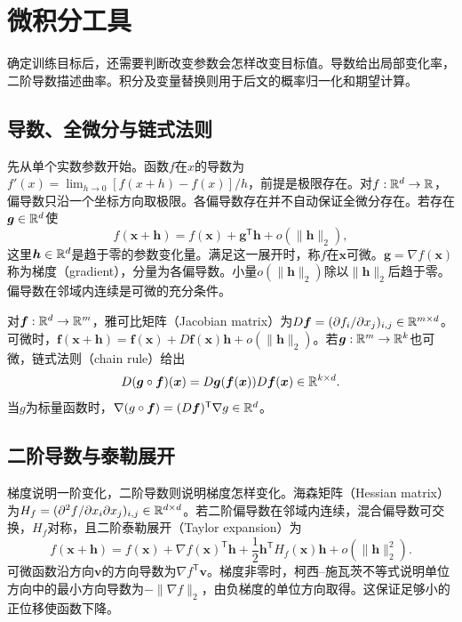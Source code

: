 \section{微积分工具}
确定训练目标后，还需要判断改变参数会怎样改变目标值。导数给出局部变化率，二阶导数描述曲率。积分及变量替换则用于后文的概率归一化和期望计算。
\subsection{导数、全微分与链式法则}
先从单个实数参数开始。函数$f$在$x$的导数为$f'(x)=\lim_{h\to0}[f(x+h)-f(x)]/h$，前提是极限存在。对$f:\mathbb{R}^d\to\mathbb{R}$，偏导数只沿一个坐标方向取极限。各偏导数存在并不自动保证全微分存在。若存在$\bm g\in\mathbb{R}^d$使
\begin{equation}
 f(\bm x+\bm h)=f(\bm x)+\bm g^{\mathsf T}\bm h+o(\|\bm h\|_2),
\end{equation}
这里$\bm h\in\mathbb{R}^d$是趋于零的参数变化量。满足这一展开时，称$f$在$\bm x$可微。$\bm g=\nabla f(\bm x)$称为梯度（gradient），分量为各偏导数。小量$o(\|\bm h\|_2)$除以$\|\bm h\|_2$后趋于零。偏导数在邻域内连续是可微的充分条件。

对$\bm f:\mathbb{R}^d\to\mathbb{R}^m$，雅可比矩阵（Jacobian matrix）为$D\bm f=(\partial f_i/\partial x_j)_{i,j}\in\mathbb{R}^{m\times d}$。可微时，$\bm f(\bm x+\bm h)=\bm f(\bm x)+D\bm f(\bm x)\bm h+o(\|\bm h\|_2)$。若$\bm g:\mathbb{R}^m\to\mathbb{R}^k$也可微，链式法则（chain rule）给出
\begin{equation}
 D(\bm g\circ\bm f)(\bm x)=D\bm g(\bm f(\bm x))D\bm f(\bm x)\in\mathbb{R}^{k\times d}.
\end{equation}
当$g$为标量函数时，$\nabla(g\circ\bm f)=(D\bm f)^{\mathsf T}\nabla g\in\mathbb{R}^d$。

\subsection{二阶导数与泰勒展开}
梯度说明一阶变化，二阶导数则说明梯度怎样变化。海森矩阵（Hessian matrix）为$H_f=(\partial^2 f/\partial x_i\partial x_j)_{i,j}\in\mathbb{R}^{d\times d}$。若二阶偏导数在邻域内连续，混合偏导数可交换，$H_f$对称，且二阶泰勒展开（Taylor expansion）为
\begin{equation}
 f(\bm x+\bm h)=f(\bm x)+\nabla f(\bm x)^{\mathsf T}\bm h
 +\frac12\bm h^{\mathsf T}H_f(\bm x)\bm h+o(\|\bm h\|_2^2).
\end{equation}
可微函数沿方向$\bm v$的方向导数为$\nabla f^{\mathsf T}\bm v$。梯度非零时，柯西--施瓦茨不等式说明单位方向中的最小方向导数为$-\|\nabla f\|_2$，由负梯度的单位方向取得。这保证足够小的正位移使函数下降。

